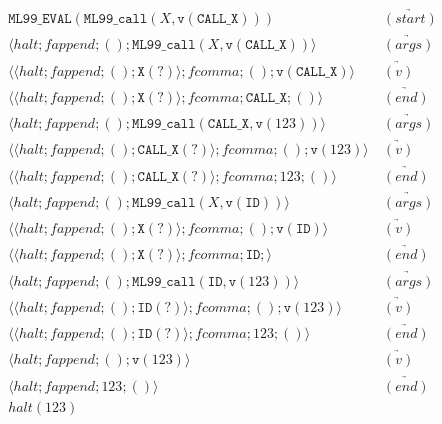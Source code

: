 \documentclass[12pt]{article}
\theoremstyle{break}
\begin{document}
\begin{example}
\begin{align*}
    \texttt{ML99\_EVAL}(\texttt{ML99\_call}(X, \texttt{v}(\texttt{CALL\_X}))) & \ \underrightarrow{(start)} \\
    \langle halt; fappend; (); \texttt{ML99\_call}(X, \texttt{v}(\texttt{CALL\_X})) \rangle & \ \underrightarrow{(args)} \\
    \langle \langle halt; fappend; (); \texttt{X}(?) \rangle; fcomma; (); \texttt{v}(\texttt{CALL\_X}) \rangle & \ \underrightarrow{(v)} \\
    \langle \langle halt; fappend; (); \texttt{X}(?) \rangle; fcomma; \texttt{CALL\_X}; () \rangle & \ \underrightarrow{(end)} \\
    \langle halt; fappend; (); \texttt{ML99\_call}(\texttt{CALL\_X}, \texttt{v}(123)) \rangle & \ \underrightarrow{(args)} \\
    \langle \langle halt; fappend; (); \texttt{CALL\_X}(?) \rangle; fcomma; (); \texttt{v}(123) \rangle & \ \underrightarrow{(v)} \\
    \langle \langle halt; fappend; (); \texttt{CALL\_X}(?) \rangle; fcomma; 123; () \rangle & \ \underrightarrow{(end)} \\
    \langle halt; fappend; (); \texttt{ML99\_call}(X, \texttt{v}(\texttt{ID})) \rangle & \ \underrightarrow{(args)} \\
    \langle \langle halt; fappend; (); \texttt{X}(?) \rangle; fcomma; (); \texttt{v}(\texttt{ID}) \rangle & \ \underrightarrow{(v)} \\
    \langle \langle halt; fappend; (); \texttt{X}(?) \rangle; fcomma; \texttt{ID}; \rangle & \ \underrightarrow{(end)} \\
    \langle halt; fappend; (); \texttt{ML99\_call}(\texttt{ID}, \texttt{v}(123)) \rangle & \ \underrightarrow{(args)} \\
    \langle \langle halt; fappend; (); \texttt{ID}(?) \rangle; fcomma; (); \texttt{v}(123) \rangle & \ \underrightarrow{(v)} \\
    \langle \langle halt; fappend; (); \texttt{ID}(?) \rangle; fcomma; 123; () \rangle & \ \underrightarrow{(end)} \\
    \langle halt; fappend; (); \texttt{v}(123) \rangle & \ \underrightarrow{(v)} \\
    \langle halt; fappend; 123; () \rangle & \ \underrightarrow{(end)} \\
    halt(123) &
\end{align*}
\end{example}
\end{document}
